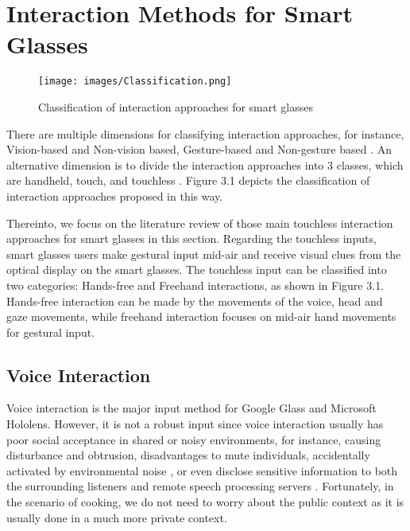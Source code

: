 \documentclass[fyp]{socreport}
\begin{document}
\section{Interaction Methods for Smart Glasses}
\begin{figure}[H]
\caption{Classification of interaction approaches for smart glasses}
\centering
\texttt{[image: images/Classification.png]}
\end{figure}

There are multiple dimensions for classifying interaction approaches, for instance, Vision-based and Non-vision based, Gesture-based and Non-gesture based \cite{bertarini2014smart}. An alternative dimension is to divide the interaction approaches into 3 classes, which are handheld, touch, and touchless \cite{tung2015user}. Figure 3.1 \cite{lee2018interaction} depicts the classification of interaction approaches proposed in this way.

Thereinto, we focus on the literature review of those main touchless interaction approaches for smart glasses in this section. Regarding the touchless inputs, smart glasses users make gestural input mid-air and receive visual clues from the optical display on the smart glasses. The touchless input can be classified into two categories: Hands-free and Freehand interactions, as shown in Figure 3.1. Hands-free interaction can be made by the movements of the voice, head and gaze movements, while freehand interaction focuses on mid-air hand movements for gestural input.

\subsection{Voice Interaction}

Voice interaction is the major input method for Google Glass and Microsoft Hololens. However, it is not a robust input since voice interaction usually has poor social acceptance in shared or noisy environments, for instance, causing disturbance and obtrusion, disadvantages to mute individuals, accidentally activated by environmental noise \cite{yi2016glassgesture}, or even disclose sensitive information to both the surrounding listeners and remote speech processing servers \cite{shatilov2019emerging}. Fortunately, in the scenario of cooking, we do not need to worry about the public context as it is usually done in a much more private context. 
\end{document}

